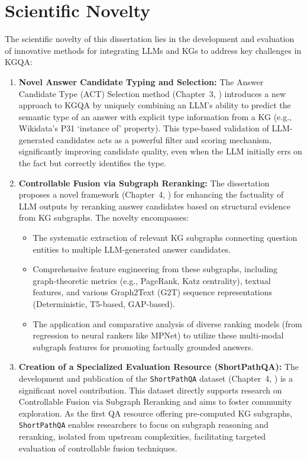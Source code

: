 \section*{Scientific Novelty}
\label{sec:synopsis:novelty}
The scientific novelty of this dissertation lies in the development and evaluation of innovative methods for integrating LLMs and KGs to address key challenges in KGQA:
\begin{enumerate}
    \item \textbf{Novel Answer Candidate Typing and Selection:} The Answer Candidate Type (ACT) Selection method (Chapter~3, \cite{DBLP:journals/corr/abs-2310-07008}) introduces a new approach to KGQA by uniquely combining an LLM's ability to predict the semantic type of an answer with explicit type information from a KG (e.g., Wikidata's P31 `instance of' property). This type-based validation of LLM-generated candidates acts as a powerful filter and scoring mechanism, significantly improving candidate quality, even when the LLM initially errs on the fact but correctly identifies the type.
    \item \textbf{Controllable Fusion via Subgraph Reranking:} The dissertation proposes a novel framework (Chapter~4, \cite{DBLP:journals/corr/abs-2310-02166}) for enhancing the factuality of LLM outputs by reranking answer candidates based on structural evidence from KG subgraphs. The novelty encompasses:
    \begin{itemize}
        \item The systematic extraction of relevant KG subgraphs connecting question entities to multiple LLM-generated answer candidates.
        \item Comprehensive feature engineering from these subgraphs, including graph-theoretic metrics (e.g., PageRank, Katz centrality), textual features, and various Graph2Text (G2T) sequence representations (Deterministic, T5-based, GAP-based).
        \item The application and comparative analysis of diverse ranking models (from regression to neural rankers like MPNet) to utilize these multi-modal subgraph features for promoting factually grounded answers.
    \end{itemize}
    \item \textbf{Creation of a Specialized Evaluation Resource (ShortPathQA):} The development and publication of the \texttt{ShortPathQA} dataset (Chapter~4, \cite{DBLP:conf/nldb/SalnikovSPQA25}) is a significant novel contribution. This dataset directly supports research on Controllable Fusion via Subgraph Reranking and aims to foster community exploration. As the first QA resource offering pre-computed KG subgraphs, \texttt{ShortPathQA} enables researchers to focus on subgraph reasoning and reranking, isolated from upstream complexities, facilitating targeted evaluation of controllable fusion techniques.
\end{enumerate}

